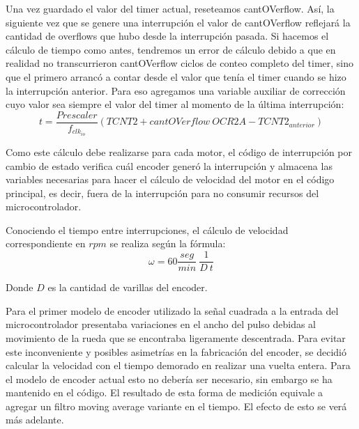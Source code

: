 \documentclass[10pt,conference,a4paper,onecolumn]{article}%
\begin{document}
Una vez guardado el valor del timer actual, reseteamos cantOVerflow. Así, la siguiente vez que se genere una interrupción el valor de cantOVerflow reflejará la cantidad de overflows que hubo desde la interrupción pasada. Si hacemos el cálculo de tiempo como antes, tendremos un error de cálculo debido a que en realidad no transcurrieron cantOVerflow ciclos de conteo completo del timer, sino que el primero arrancó a contar desde el valor que tenía el timer cuando se hizo la interrupción anterior. Para eso agregamos una variable auxiliar de corrección cuyo valor sea siempre el valor del timer al momento de la última interrupción:
 \begin{equation}
 t=\frac{Prescaler}{f_{clk_{io}}} (TCNT2+cantOVerflow\ OCR2A-TCNT2_{anterior})
 \end{equation}

Como este cálculo debe realizarse para cada motor, el código de interrupción por cambio de estado verifica cuál encoder generó la interrupción y almacena las variables necesarias para hacer el cálculo de velocidad del motor en el código principal, es decir, fuera de la interrupción para no consumir recursos del microcontrolador.

Conociendo el tiempo entre interrupciones, el cálculo de velocidad correspondiente en $rpm$ se realiza según la fórmula:
\begin{equation*}
\omega=60 \frac{seg}{min}\ \frac{1}{D\ t}
\end{equation*}

Donde $D$ es la cantidad de varillas del encoder. 

Para el primer modelo de encoder utilizado la señal cuadrada a la entrada del microcontrolador presentaba variaciones en el ancho del pulso debidas al movimiento de la rueda que se encontraba ligeramente descentrada. Para evitar este inconveniente y posibles asimetrías en la fabricación del encoder, se decidió calcular la velocidad con el tiempo demorado en realizar una vuelta entera. Para el modelo de encoder actual esto no debería ser necesario, sin embargo se ha mantenido en el código. El resultado de esta forma de medición equivale a agregar un filtro moving average variante en el tiempo. El efecto de esto se verá más adelante.
\end{document}
